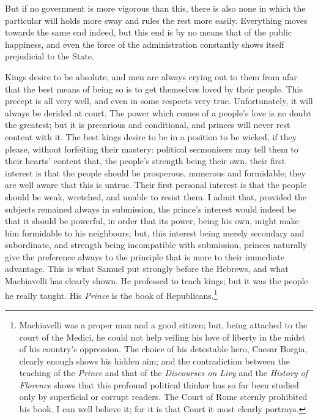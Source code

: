 \documentclass[12pt]{book}
\begin{document}
But if no government is more vigorous than this, there is also none in which the particular will holds more sway and rules the rest more easily. Everything moves towards the same end indeed, but this end is by no means that of the public happiness, and even the force of the administration constantly shows itself prejudicial to the State.

Kings desire to be absolute, and men are always crying out to them from afar that the best means of being so is to get themselves loved by their people. This precept is all very well, and even in some respects very true. Unfortunately, it will always be derided at court. The power which comes of a people's love is no doubt the greatest; but it is precarious and conditional, and princes will never rest content with it. The best kings desire to be in a position to be wicked, if they please, without forfeiting their mastery: political sermonisers may tell them to their hearts' content that, the people's strength being their own, their first interest is that the people should be prosperous, numerous and formidable; they are well aware that this is untrue. Their first personal interest is that the people should be weak, wretched, and unable to resist them. I admit that, provided the subjects remained always in submission, the prince's interest would indeed be that it should be powerful, in order that its power, being his own, might make him formidable to his neighbours; but, this interest being merely secondary and subordinate, and strength being incompatible with submission, princes naturally give the preference always to the principle that is more to their immediate advantage. This is what Samuel put strongly before the Hebrews, and what Machiavelli has clearly shown. He professed to teach kings; but it was the people he really taught. His \textit{Prince} is the book of Republicans.\footnote{Machiavelli was a proper man and a good citizen; but, being attached to the court of the Medici, he could not help veiling his love of liberty in the midst of his country's oppression. The choice of his detestable hero, Caesar Borgia, clearly enough shows his hidden aim; and the contradiction between the teaching of the \textit{Prince} and that of the \textit{Discourses on Livy} and the \textit{History of Florence} shows that this profound political thinker has so far been studied only by superficial or corrupt readers. The Court of Rome sternly prohibited his book. I can well believe it; for it is that Court it most clearly portrays.}
\end{document}
